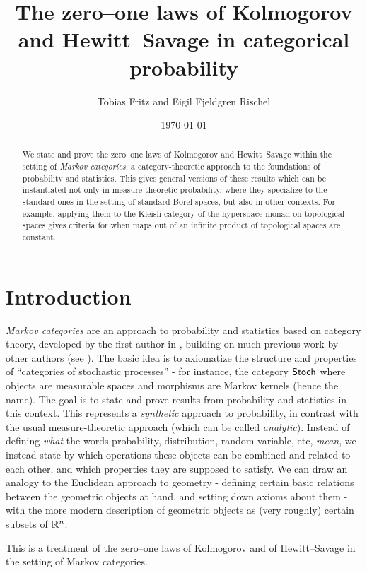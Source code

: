 \documentclass[11pt]{article}
\author{Tobias Fritz and Eigil Fjeldgren Rischel}
\title{The zero--one laws of Kolmogorov and Hewitt--Savage in categorical probability}
\date{\today}
\begin{document}
\maketitle

\begin{abstract}
	We state and prove the zero--one laws of Kolmogorov and Hewitt--Savage within the setting of \emph{Markov categories}, a category-theoretic approach to the foundations of probability and statistics. This gives general versions of these results which can be instantiated not only in measure-theoretic probability, where they specialize to the standard ones in the setting of standard Borel spaces, but also in other contexts. For example, applying them to the Kleisli category of the hyperspace monad on topological spaces gives criteria for when maps out of an infinite product of topological spaces are constant.
\end{abstract}

\tableofcontents

\section{Introduction}

\emph{Markov categories} are an approach to probability and statistics based on category theory, developed by the first author in \cite{markov_cats}, building on much previous work by other authors (see ).
The basic idea is to axiomatize the structure and properties of ``categories of stochastic processes'' - for instance, the category $\operatorname{\mathsf{Stoch}}$ where objects are measurable spaces and morphisms are Markov kernels (hence the name).
The goal is to state and prove results from probability and statistics in this context.
This represents a \emph{synthetic} approach to probability, in contrast with the usual measure-theoretic approach (which can be called \emph{analytic}).
Instead of defining \emph{what} the words probability, distribution, random variable, etc, \emph{mean}, we instead state by which operations these objects can be combined and related to each other, and which properties they are supposed to satisfy.
We can draw an analogy to the Euclidean approach to geometry - defining certain basic relations between the geometric objects at hand, and setting down axioms about them - with the more modern description of geometric objects as (very roughly) certain subsets of $\mathbb{R}^n$.


This is a treatment of the zero--one laws of Kolmogorov and of Hewitt--Savage in the setting of Markov categories.
\end{document}
